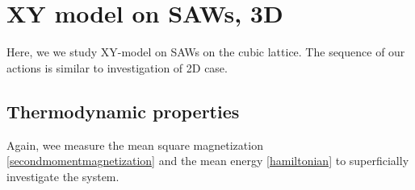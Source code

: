 \section{XY model on SAWs, 3D}
Here, we we study XY-model on SAWs on the cubic lattice. The sequence of our actions is similar to investigation of 2D case. 



\subsection{Thermodynamic properties}

 Again, wee measure the mean square magnetization \eqref{secondmomentmagnetization} and the mean energy \eqref{hamiltonian} to superficially investigate the system. 
 
 
 
